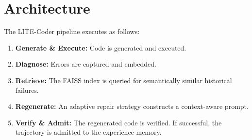 \section{Architecture}
The LITE-Coder pipeline executes as follows:
\begin{enumerate}
    \item \textbf{Generate \& Execute:} Code is generated and executed.
    \item \textbf{Diagnose:} Errors are captured and embedded.
    \item \textbf{Retrieve:} The FAISS index is queried for semantically similar historical failures.
    \item \textbf{Regenerate:} An adaptive repair strategy constructs a context-aware prompt.
    \item \textbf{Verify \& Admit:} The regenerated code is verified. If successful, the trajectory is admitted to the experience memory.
\end{enumerate}
